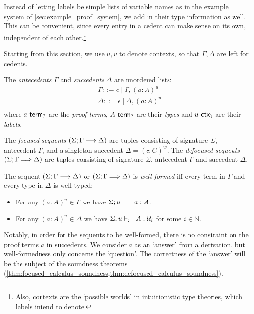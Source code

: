 \documentclass[twoside]{report}
\begin{document}
Instead of letting labels be simple lists of variable names as in the example system of \cref{sec:example_proof_system}, we add in their type information as well. This can be convenient, since every entry in a cedent can make sense on its own, independent of each other.\footnote{Also, contexts are the `possible worlds' in intuitionistic type theories, which labels intend to denote.}

Starting from this section, we use $u, v$ to denote contexts, so that $\Gamma, \Delta$ are left for cedents.

\begin{definition}[Cedents]
\label{def:cedents}
The \emph{antecedents} $\Gamma$ and \emph{succedents} $\Delta$ are unordered lists:
$$
\begin{aligned}
    & \Gamma ::=
        \epsilon \mid \Gamma, (a : A)^u \\
    & \Delta ::=
        \epsilon \mid \Delta, (a : A)^u \\
\end{aligned}
$$
where $a \ \mathsf{term}_{?}$ are the \emph{proof terms}, $A \ \mathsf{term}_{?}$ are their \emph{types} and $u \ \mathsf{ctx}_{?}$ are their \emph{labels}.
\end{definition}

\begin{definition}[Sequents]
\label{def:sequents}
The \emph{focused sequents} $(\Sigma; \Gamma \longrightarrow \Delta)$ are tuples consisting of signature $\Sigma$, antecedent $\Gamma$, and a singleton succedent $\Delta = (c : C)^w$. The \emph{defocused sequents} $(\Sigma; \Gamma \Longrightarrow \Delta)$ are tuples consisting of signature $\Sigma$, antecedent $\Gamma$ and succedent $\Delta$.
\end{definition}

\begin{definition}
\label{def:well_formed_sequents}
The sequent $(\Sigma; \Gamma \longrightarrow \Delta)$ or $(\Sigma; \Gamma \Longrightarrow \Delta)$ is \emph{well-formed} iff every term in $\Gamma$ and every type in $\Delta$ is well-typed:
\begin{itemize}[noitemsep]
    \item For any $(a : A)^u \in \Gamma$ we have $\Sigma; u \vdash_{:=} a : A$.
    \item For any $(a : A)^u \in \Delta$ we have $\Sigma; u \vdash_{:=} A : \mathcal U_i$ for some $i\in\mathbb N$.
\end{itemize}
\end{definition}

Notably, in order for the sequents to be well-formed, there is no constraint on the proof terms $a$ in succedents. We consider $a$ as an `answer' from a derivation, but well-formedness only concerns the `question'. The correctness of the `answer' will be the subject of the soundness theorems (\cref{thm:focused_calculus_soundness,thm:defocused_calculus_soundness}).
\end{document}
